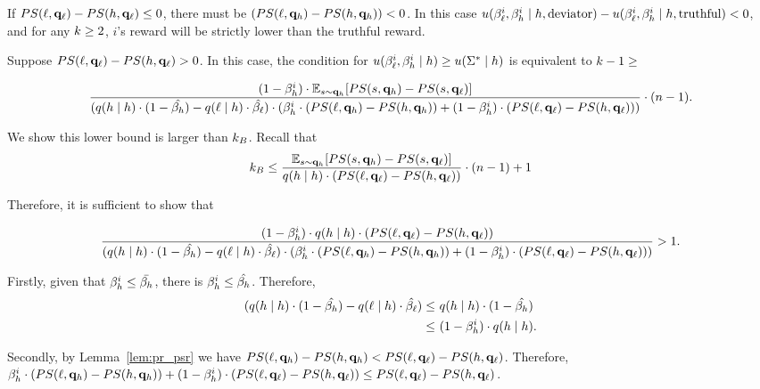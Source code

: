 If $PS(\ell, \mathbf{q}_\ell) - PS(h, \mathbf{q}_\ell) \le 0$, there must be $(PS(\ell, \mathbf{q}_h) - PS(h, \mathbf{q}_h)) < 0$. In this case $u(\beta_{\ell}^i, \beta_{h}^i \mid h, \text{deviator}) - u(\beta_{\ell}^i, \beta_{h}^i \mid h, \text{truthful}) < 0$, and for any $k \ge 2$, $i$'s reward will be strictly lower than the truthful reward. 

Suppose $PS(\ell, \mathbf{q}_\ell) - PS(h, \mathbf{q}_\ell) > 0$. In this case, the condition for  $u(\beta_{\ell}^i, \beta_{h}^i \mid h) \ge u(\Sigma^* \mid h)$ is equivalent to $k - 1 \ge$
\begin{smallblock}
    \begin{align*}
    \frac{(1 - \beta_{h}^i)\cdot \mathbb{E}_{s\sim \mathbf{q}_{h}}[PS(s, \mathbf{q}_{h}) - PS(s, \mathbf{q}_{\ell})]}{(q(h\mid h)\cdot (1 - \hat{\beta_{h}}) - q(\ell \mid h) \cdot \hat{\beta_{\ell}})\cdot (\beta_{h}^i  \cdot (PS(\ell, \mathbf{q}_h) - PS(h, \mathbf{q}_h)) + ( 1- \beta_{h}^i) \cdot (PS(\ell, \mathbf{q}_\ell) - PS(h, \mathbf{q}_\ell)))}\cdot (n - 1).
\end{align*}
\end{smallblock}


We show this lower bound is larger than $k_B$. 
Recall that 
\begin{equation*}
    k_B \le \frac{\mathbb{E}_{s\sim \mathbf{q}_{h}}[PS(s, \mathbf{q}_{h}) - PS(s, \mathbf{q}_{\ell})]}{q(h\mid h)\cdot (PS(\ell, \mathbf{q}_\ell) - PS(h, \mathbf{q}_\ell))}\cdot (n - 1) + 1
\end{equation*}

Therefore, it is sufficient to show that 
\begin{smallblock}
   \begin{align*}
    \frac{(1 - \beta_{h}^i)\cdot q(h\mid h)\cdot (PS(\ell, \mathbf{q}_\ell) - PS(h, \mathbf{q}_\ell))}{(q(h\mid h)\cdot (1 - \hat{\beta_{h}}) - q(\ell \mid h) \cdot \hat{\beta_{\ell}})\cdot (\beta_{h}^i  \cdot (PS(\ell, \mathbf{q}_h) - PS(h, \mathbf{q}_h)) + ( 1- \beta_{h}^i) \cdot (PS(\ell, \mathbf{q}_\ell) - PS(h, \mathbf{q}_\ell)))} > 1.
\end{align*}
\end{smallblock}


Firstly, given that $\beta_{h}^i \le \bar{\beta_{h}}$, there is $\beta_{h}^i \le \hat{\beta_{h}}$. Therefore, 
\begin{align*}
    (q(h\mid h)\cdot (1 - \hat{\beta_{h}}) - q(\ell \mid h) \cdot \hat{\beta_{\ell}}) \le &\ q(h\mid h)\cdot (1 - \hat{\beta_{h}}) \\
    \le &\ (1 - \beta_{h}^i)\cdot q(h\mid h). 
\end{align*}

Secondly, by Lemma~\ref{lem:pr_psr} we have $PS(\ell, \mathbf{q}_h) - PS(h, \mathbf{q}_h) < PS(\ell, \mathbf{q}_\ell) - PS(h, \mathbf{q}_\ell)$. Therefore, $\beta_{h}^i\cdot (PS(\ell, \mathbf{q}_h) - PS(h, \mathbf{q}_h)) + ( 1- \beta_{h}^i) \cdot (PS(\ell, \mathbf{q}_\ell) - PS(h, \mathbf{q}_\ell)) \le PS(\ell, \mathbf{q}_\ell) - PS(h, \mathbf{q}_\ell)$. 

